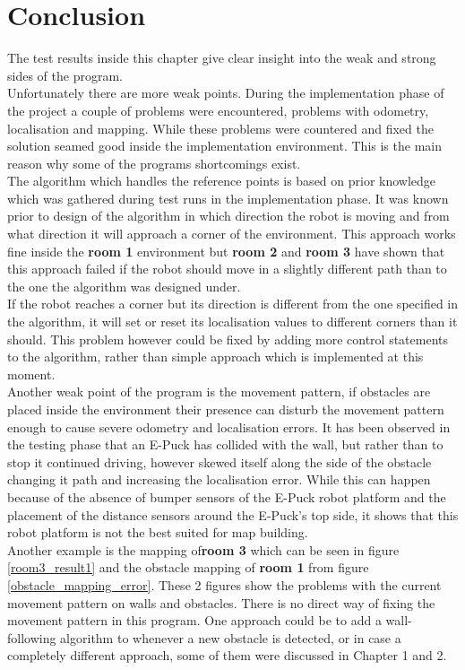 \section{Conclusion}
The test results inside this chapter give clear insight into the weak and strong sides of the program.\\
Unfortunately there are more weak points. During the implementation phase of the project a couple of problems were encountered, problems with odometry, localisation and mapping. While these problems were countered and fixed the solution seamed good inside the implementation environment. This is the main reason why some of the programs shortcomings exist.\\[3ex]

The algorithm which handles the reference points is based on prior knowledge which was gathered during test runs in the implementation phase. It was known prior to design of the algorithm in which direction the robot is moving and from what direction it will approach a corner of the environment. This approach works fine inside the \textbf{room 1} environment but \textbf{room 2} and \textbf{room 3} have shown that this approach failed if the robot should move in a slightly different path than to the one the algorithm was designed under. \\
If the robot reaches a corner but its direction is different from the one specified in the algorithm, it will set or reset its localisation values to different corners than it should. This problem however could be fixed by adding more control statements to the algorithm, rather than simple approach which is implemented at this moment. \\[3ex]

Another weak point of the program is the movement pattern, if obstacles are placed inside the environment their presence can disturb the movement pattern enough to cause severe odometry and localisation errors. It has been observed in the testing phase that an E-Puck has collided with the wall, but rather than to stop it continued driving, however skewed itself along the side of the obstacle changing it path and increasing the localisation error. While this can happen because of the absence of bumper sensors of the E-Puck robot platform and the placement of the distance sensors around the E-Puck's top side, it shows that this robot platform is not the best suited for map building.\\
Another example is the mapping of\textbf{room 3 }which can be seen in figure \ref{room3_result1} and the obstacle mapping of \textbf{room 1} from figure \ref{obstacle_mapping_error}. These 2 figures show the problems with the current movement pattern on walls and obstacles. There is no direct way of fixing the movement pattern in this program. One approach could be to add a wall-following algorithm to whenever a new obstacle is detected, or in case a completely different approach, some of them were discussed in Chapter 1 and 2. \\[3ex]

